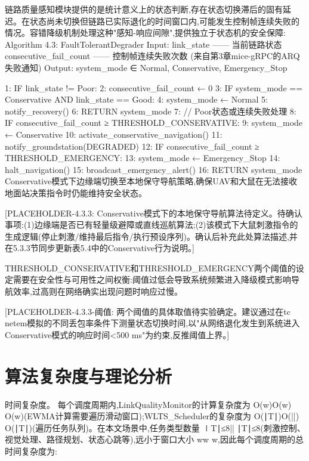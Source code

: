 链路质量感知模块提供的是统计意义上的状态判断,存在状态切换滞后的固有延迟。在状态尚未切换但链路已实际退化的时间窗口内,可能发生控制帧连续失败的情况。容错降级机制处理这种"感知-响应间隙",提供独立于状态机的安全保障:
Algorithm 4.3: FaultTolerantDegrader
Input:  link_state              —— 当前链路状态
        consecutive_fail_count  —— 控制帧连续失败次数
                                   (来自第3章mice-gRPC的ARQ失败通知)
Output: system_mode ∈ {Normal, Conservative, Emergency_Stop}

1:  IF link_state != Poor:
2:      consecutive_fail_count ← 0
3:      IF system_mode == Conservative AND link_state == Good:
4:          system_mode ← Normal
5:          notify_recovery()
6:      RETURN system_mode
7:  // Poor状态或连续失败处理
8:  IF consecutive_fail_count ≥ THRESHOLD_CONSERVATIVE:
9:      system_mode ← Conservative
10:     activate_conservative_navigation()
11:     notify_groundstation(DEGRADED)
12: IF consecutive_fail_count ≥ THRESHOLD_EMERGENCY:
13:     system_mode ← Emergency_Stop
14:     halt_navigation()
15:     broadcast_emergency_alert()
16: RETURN system_mode
Conservative模式下边缘端切换至本地保守导航策略,确保UAV和大鼠在无法接收地面站决策指令时仍能维持安全状态。

[PLACEHOLDER-4.3.3: Conservative模式下的本地保守导航算法待定义。待确认事项:(1)边缘端是否已有轻量级避障或直线巡航算法;(2)该模式下大鼠刺激指令的生成逻辑(停止刺激/维持最后指令/执行预设序列)。确认后补充此处算法描述,并在5.3.3节同步更新表5.4中的Conservative行为说明。]

THRESHOLD_CONSERVATIVE和THRESHOLD_EMERGENCY两个阈值的设定需要在安全性与可用性之间权衡:阈值过低会导致系统频繁进入降级模式影响导航效率,过高则在网络确实出现问题时响应过慢。

[PLACEHOLDER-4.3.3-阈值: 两个阈值的具体取值待实验确定。建议通过在tc netem模拟的不同丢包率条件下测量状态切换时间,以"从网络退化发生到系统进入Conservative模式的响应时间<500 ms"为约束,反推阈值上界。]

\section{算法复杂度与理论分析}

时间复杂度。 每个调度周期内,LinkQualityMonitor的计算复杂度为 O(w)O(w)
O(w)(EWMA计算需要遍历滑动窗口);WLTS\_Scheduler的复杂度为 O(∣T∣)O(||)
O(∣T∣)(遍历任务队列)。在本文场景中,任务类型数量 ∣T∣≤8|| 
∣T∣≤8(刺激控制、视觉处理、路径规划、状态心跳等),远小于窗口大小 ww
w,因此每个调度周期的总时间复杂度为:

